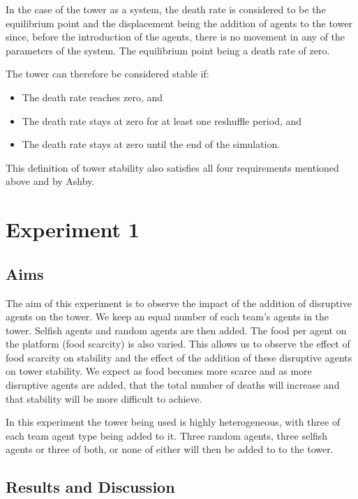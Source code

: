 In the case of the tower as a system, the death rate is considered to be the equilibrium point and the displacement being the addition of agents to the tower since, before the introduction of the agents, there is no movement in any of the parameters of the system. The equilibrium point being a death rate of zero. 

The tower can therefore be considered stable if:
\begin{itemize}
    \item The death rate reaches zero, and
    \item The death rate stays at zero for at least one reshuffle period, and
    \item The death rate stays at zero until the end of the simulation.
\end{itemize}
 
This definition of tower stability also satisfies all four requirements mentioned above and by Ashby.

\section{Experiment 1}
\label{sec: Experiment 1}
\subsection{Aims}
\label{subsec: E1-Aims}
The aim of this experiment is to observe the impact of the addition of disruptive agents on the tower. 
We keep an equal number of each team’s agents in the tower. Selfish agents and random agents are then added. The food per agent on the platform (food scarcity) is also varied. This allows us to observe the effect of food scarcity on stability and the effect of the addition of these disruptive agents on tower stability. We expect as food becomes more scarce and as more disruptive agents are added, that the total number of deaths will increase and that stability will be more difficult to achieve.

In this experiment the tower being used is highly heterogeneous, with three of each team agent type being added to it. Three random agents, three selfish agents or three of both, or none of either will then be added to to the tower.
\subsection{Results and Discussion}
\label{subsec: E1-Results and Discussion}

